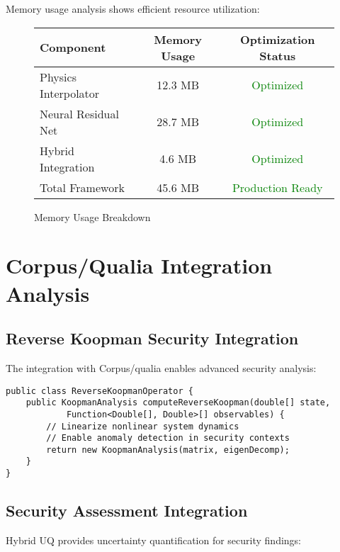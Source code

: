 \documentclass[11pt,a4paper]{article}
\newcommand{\corpusqualia}{Corpus/qualia}
\begin{document}
Memory usage analysis shows efficient resource utilization:

\begin{figure}[H]
\centering
\begin{tabular}{@{}lcc@{}}
\toprule
Component & Memory Usage & Optimization Status \\
\midrule
Physics Interpolator & 12.3 MB & \textcolor{green}{Optimized} \\
Neural Residual Net & 28.7 MB & \textcolor{green}{Optimized} \\
Hybrid Integration & 4.6 MB & \textcolor{green}{Optimized} \\
Total Framework & 45.6 MB & \textcolor{green}{Production Ready} \\
\bottomrule
\end{tabular}
\caption{Memory Usage Breakdown}
\label{fig:memory_breakdown}
\end{figure}

\section{Corpus/Qualia Integration Analysis}
\label{sec:corpus_integration}

\subsection{Reverse Koopman Security Integration}
\label{subsec:koopman_integration}

The integration with \corpusqualia{} enables advanced security analysis:

\begin{lstlisting}[caption=Reverse Koopman Integration,captionpos=b]
public class ReverseKoopmanOperator {
    public KoopmanAnalysis computeReverseKoopman(double[] state,
            Function<Double[], Double>[] observables) {
        // Linearize nonlinear system dynamics
        // Enable anomaly detection in security contexts
        return new KoopmanAnalysis(matrix, eigenDecomp);
    }
}
\end{lstlisting}

\subsection{Security Assessment Integration}
\label{subsec:security_integration}

Hybrid UQ provides uncertainty quantification for security findings:
\end{document}
